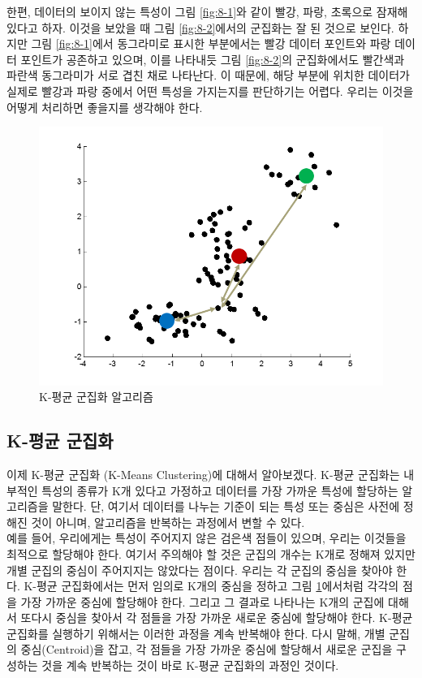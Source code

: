 \documentclass[a4paper]{oblivoir}
\begin{document}
한편, 데이터의 보이지 않는 특성이 그림 \ref{fig:8-1}와 같이 빨강, 파랑, 초록으로 잠재해 있다고 하자. 이것을 보았을 때 그림 \ref{fig:8-2}에서의 군집화는 잘 된 것으로 보인다. 하지만 그림 \ref{fig:8-1}에서 동그라미로 표시한 부분에서는 빨강 데이터 포인트와 파랑 데이터 포인트가 공존하고 있으며, 이를 나타내듯 그림 \ref{fig:8-2}의 군집화에서도 빨간색과 파란색 동그라미가 서로 겹친 채로 나타난다. 이 때문에, 해당 부분에 위치한 데이터가 실제로 빨강과 파랑 중에서 어떤 특성을 가지는지를 판단하기는 어렵다. 우리는 이것을 어떻게 처리하면 좋을지를 생각해야 한다. \\

\begin{figure}[ht] \centering 
\includegraphics[scale=0.6]{fig8_4.png} 
\caption{K-평균 군집화 알고리즘}
\label{fig:8-4}
\end{figure} 

\subsection{K-평균 군집화}

이제 K-평균 군집화 (K-Means Clustering)에 대해서 알아보겠다. K-평균 군집화는 내부적인 특성의 종류가 K개 있다고 가정하고 데이터를 가장 가까운 특성에 할당하는 알고리즘을 말한다. 단, 여기서 데이터를 나누는 기준이 되는 특성 또는 중심은 사전에 정해진 것이 아니며, 알고리즘을 반복하는 과정에서 변할 수 있다. \\

예를 들어, 우리에게는 특성이 주어지지 않은 검은색 점들이 있으며, 우리는 이것들을 최적으로 할당해야 한다. 여기서 주의해야 할 것은 군집의 개수는 K개로 정해져 있지만 개별 군집의 중심이 주어지지는 않았다는 점이다. 우리는 각 군집의 중심을 찾아야 한다. K-평균 군집화에서는 먼저 임의로 K개의 중심을 정하고 그림 \ref{fig:8-4}에서처럼 각각의 점을 가장 가까운 중심에 할당해야 한다. 그리고 그 결과로 나타나는 K개의 군집에 대해서 또다시 중심을 찾아서 각 점들을 가장 가까운 새로운 중심에 할당해야 한다. K-평균 군집화를 실행하기 위해서는 이러한 과정을 계속 반복해야 한다. 다시 말해, 개별 군집의 중심(Centroid)을 잡고, 각 점들을 가장 가까운 중심에 할당해서 새로운 군집을 구성하는 것을 계속 반복하는 것이 바로 K-평균 군집화의 과정인 것이다. \\   
\end{document}
